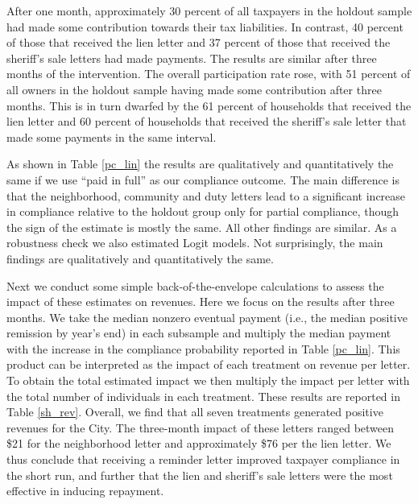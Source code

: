 \documentclass[12pt]{article}
\begin{document}
After one month, approximately 30 percent of all taxpayers in the
holdout sample had made some contribution towards their tax
liabilities. In contrast, 40 percent of those that received the lien
letter and 37 percent of those that received the sheriff's sale
letters had made payments. The results are similar after three months
of the intervention.  The overall participation rate rose, with 51
percent of all owners in the holdout sample having made some
contribution after three months.  This is in turn dwarfed by the 61
percent of households that received the lien letter and 60 percent of
households that received the sheriff's sale letter that made some
payments in the same interval.

As shown in Table \ref{pc_lin} the results are qualitatively and
quantitatively the same if we use ``paid in full'' as our compliance
outcome. The main difference is that the neighborhood, community and
duty letters lead to a significant increase in compliance relative to
the holdout group only for partial compliance, though the sign of the
estimate is mostly the same. All other findings are similar. As a
robustness check we also estimated Logit models.  Not surprisingly,
the main findings are qualitatively and quantitatively the same.

Next we conduct some simple back-of-the-envelope calculations to
assess the impact of these estimates on revenues. Here we focus on the
results after three months. We take the median nonzero eventual
payment (i.e., the median positive remission by year's end) in each
subsample and multiply the median payment with the increase in the
compliance probability reported in Table \ref{pc_lin}. This product
can be interpreted as the impact of each treatment on revenue per
letter. To obtain the total estimated impact we then multiply the
impact per letter with the total number of individuals in each
treatment. These results are reported in Table \ref{sh_rev}.  Overall,
we find that all seven treatments generated positive revenues for the
City.  The three-month impact of these letters ranged between \$21 for
the neighborhood letter and approximately \$76 per the lien letter. We
thus conclude that receiving a reminder letter improved taxpayer
compliance in the short run, and further that the lien and sheriff's
sale letters were the most effective in inducing repayment.
\end{document}
